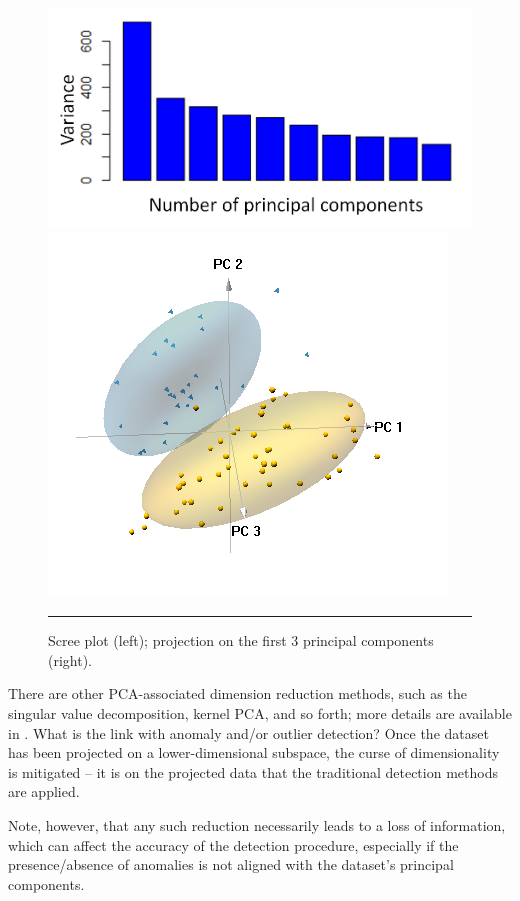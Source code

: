 \documentclass[20pt,landscape,footrule,headrule]{foils}
\newcommand{\newl}{\newline\newline}
\begin{document}
{{\begin{figure}[t]
    \centering
     \includegraphics[width=.55\textwidth]{ADOA/Images/screeleuk_EN.png}
    \includegraphics[width=.4\textwidth]{ADOA/Images/3dpcleuk.PNG}
    \caption{Scree plot (left); projection on the first 3 principal components (right).}\hrule
    \label{fig0}
\end{figure}
 
\noindent There are other PCA-associated dimension reduction methods, such as the singular value decomposition, kernel PCA, and so forth; more details are available in \cite{BLMMP}.
\newl What is the link with anomaly and/or outlier detection? Once the dataset has been projected on a lower-dimensional subspace, the curse of dimensionality is mitigated -- it is on the projected data that the traditional detection methods are applied. \par Note, however, that any such reduction necessarily leads to a loss of information, which can affect the accuracy of the detection procedure, especially if the presence/absence of anomalies is not aligned with the dataset's principal components. 

}}
\end{document}
